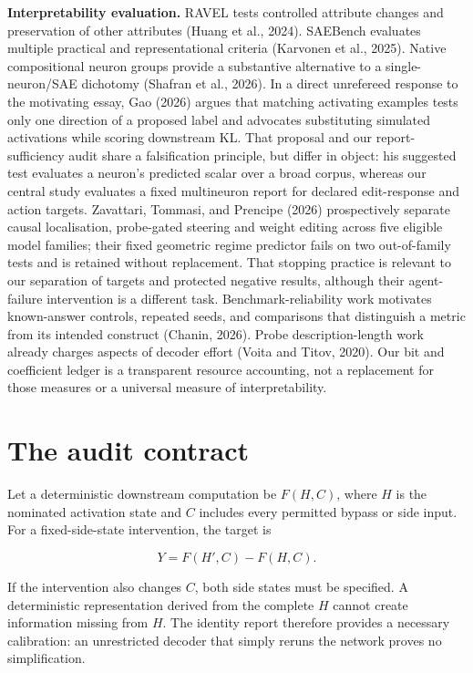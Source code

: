 \documentclass[
  british,
  11pt,
  a4paper,
]{article}
\begin{document}
\textbf{Interpretability evaluation.} RAVEL tests controlled attribute
changes and preservation of other attributes (Huang et al., 2024).
SAEBench evaluates multiple practical and representational criteria
(Karvonen et al., 2025). Native compositional neuron groups provide a
substantive alternative to a single-neuron/SAE dichotomy (Shafran et
al., 2026). In a direct unrefereed response to the motivating essay, Gao
(2026) argues that matching activating examples tests only one direction
of a proposed label and advocates substituting simulated activations
while scoring downstream KL. That proposal and our report-sufficiency
audit share a falsification principle, but differ in object: his
suggested test evaluates a neuron's predicted scalar over a broad
corpus, whereas our central study evaluates a fixed multineuron report
for declared edit-response and action targets. Zavattari, Tommasi, and
Prencipe (2026) prospectively separate causal localisation, probe-gated
steering and weight editing across five eligible model families; their
fixed geometric regime predictor fails on two out-of-family tests and is
retained without replacement. That stopping practice is relevant to our
separation of targets and protected negative results, although their
agent-failure intervention is a different task. Benchmark-reliability
work motivates known-answer controls, repeated seeds, and comparisons
that distinguish a metric from its intended construct (Chanin, 2026).
Probe description-length work already charges aspects of decoder effort
(Voita and Titov, 2020). Our bit and coefficient ledger is a transparent
resource accounting, not a replacement for those measures or a universal
measure of interpretability.

\section{The audit contract}\label{the-audit-contract}

Let a deterministic downstream computation be \(F(H,C)\), where \(H\) is
the nominated activation state and \(C\) includes every permitted bypass
or side input. For a fixed-side-state intervention, the target is

\[Y=F(H',C)-F(H,C).\]

If the intervention also changes \(C\), both side states must be
specified. A deterministic representation derived from the complete
\(H\) cannot create information missing from \(H\). The identity report
therefore provides a necessary calibration: an unrestricted decoder that
simply reruns the network proves no simplification.
\end{document}
